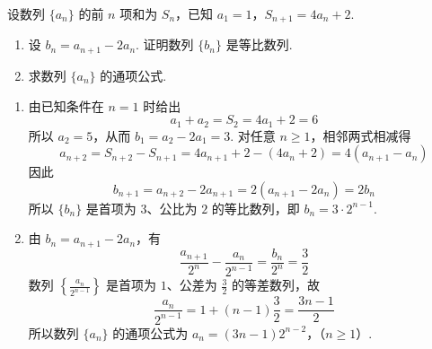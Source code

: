 \begin{problem}
设数列 \(\{a_{n}\}\) 的前 \(n\) 项和为 \(S_{n}\)，已知 \(a_{1} = 1\)，\(S_{n+1} = 4a_{n} + 2\).

\begin{enumerate}
\item 设 \(b_{n} = a_{n+1} - 2a_{n}\). 证明数列 \(\{b_n\}\) 是等比数列.
\item 求数列 \(\{a_{n}\}\) 的通项公式.
\end{enumerate}

\begin{solution}
\begin{enumerate}
\item 由已知条件在 \(n=1\) 时给出
\[
a_{1}+a_{2}=S_{2}=4a_{1}+2=6
\]
所以 \(a_{2}=5\)，从而 \(b_{1}=a_{2}-2a_{1}=3\). 对任意 \(n\geqslant1\)，相邻两式相减得
\[
a_{n+2}=S_{n+2}-S_{n+1}=4a_{n+1}+2-(4a_{n}+2)=4(a_{n+1}-a_{n})
\]
因此
\[
b_{n+1}=a_{n+2}-2a_{n+1}=2(a_{n+1}-2a_{n})=2b_{n}
\]
所以 \(\{b_{n}\}\) 是首项为 \(3\)、公比为 \(2\) 的等比数列，即 \(b_{n}=3\cdot2^{n-1}\).
\item 由 \(b_{n}=a_{n+1}-2a_{n}\)，有
\[
\frac{a_{n+1}}{2^{n}}-\frac{a_{n}}{2^{n-1}}=\frac{b_{n}}{2^{n}}=\frac32
\]
数列 \(\left\{\frac{a_{n}}{2^{n-1}}\right\}\) 是首项为 \(1\)、公差为 \(\frac32\) 的等差数列，故
\[
\frac{a_{n}}{2^{n-1}}=1+(n-1)\frac32=\frac{3n-1}{2}
\]
所以数列 \(\{a_n\}\) 的通项公式为
\(a_n=(3n-1)2^{n-2}\)，（\(n\geqslant1\)）.
\end{enumerate}
\end{solution}
\end{problem}


